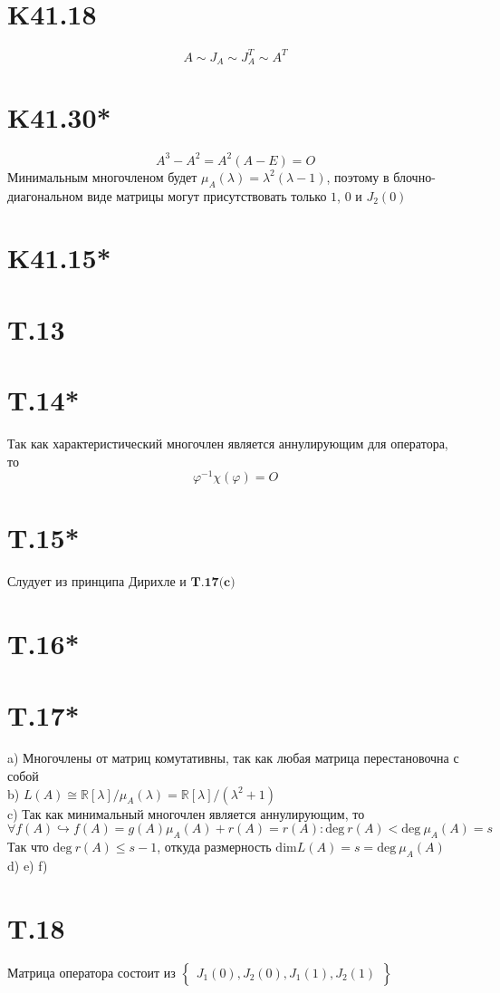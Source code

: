 \documentclass[a4paper,12pt]{article} %
\begin{document}
\section*{K41.18}$$A\sim J_A\sim J_A^{T}\sim A^{T}$$
\section*{K41.30*} $$A^3-A^2=A^2(A-E)=O$$
Минимальным многочленом будет $\mu_A(\lambda)=\lambda^2(\lambda-1)$, поэтому в блочно-диагональном виде матрицы могут присутствовать только $1$, $0$ и $J_2(0)$
\section*{K41.15*}
\section*{T.13}
\section*{T.14*}
Так как характеристический многочлен является аннулирующим для оператора, то $$\varphi^{-1}\chi(\varphi)=O$$
\section*{T.15*} Слудует из принципа Дирихле и $\textbf{T.17(c)}$
\section*{T.16*}
\section*{T.17*}
a) Многочлены от матриц комутативны, так как любая матрица перестановочна с собой\\
b) $L(A)\cong \mathbb{R}\left[\lambda\right]/\mu_A(\lambda)=\mathbb{R}\left[\lambda\right]/(\lambda^2+1)$\\
c) Так как минимальный многочлен является аннулирующим, то $$\forall f(A)\hookrightarrow f(A)=g(A)\mu_A(A)+r(A)=r(A):\mathrm{deg}\ r(A)<\mathrm{deg}\ \mu_A(A)=s$$
Так что $\mathrm{deg}\ r(A)\le s-1$, откуда размерность $\mathrm{dim}L(A)=s=\mathrm{deg}\ \mu_A(A)$\\
d)
e)
f)
\section*{T.18} Матрица оператора состоит из $\begin{Bmatrix}
    J_1(0),J_2(0),J_1(1),J_2(1)
\end{Bmatrix}$
\end{document}
